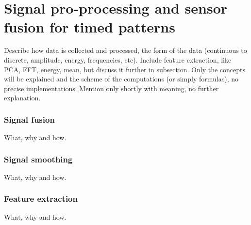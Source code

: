 
\section{Signal pro-processing and sensor fusion for timed patterns}
  Describe how data is collected and processed, the form of the data (continuous to discrete, amplitude, energy, frequencies, etc).
  Include feature extraction, like PCA, FFT, energy, mean, but discuss it further in subsection.
  Only the concepts will be explained and the scheme of the computations (or simply formulas), no precise implementations.
  Mention only shortly with meaning, no further explanation.

    \subsubsection{Signal fusion}
    What, why and how.

    \subsubsection{Signal smoothing}
    What, why and how.

    \subsubsection{Feature extraction}
    What, why and how.